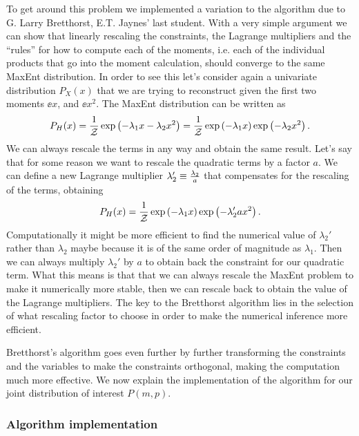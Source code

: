 To get around this problem we implemented a variation to the algorithm due to
G. Larry Bretthorst, E.T. Jaynes' last student. With a very simple argument we
can show that linearly rescaling the constraints, the Lagrange multipliers and
the ``rules'' for how to compute each of the moments, i.e. each of the
individual products that go into the moment calculation, should converge to the
same MaxEnt distribution. In order to see this let's consider again a
univariate distribution $P_X(x)$ that we are trying to reconstruct given the
first two moments $\ee{x}$, and $\ee{x^2}$. The MaxEnt distribution can be
written as
\begin{equation}
  P_H(x) = {1 \over \mathcal{Z}}
  \exp \left(- \lambda_1 x - \lambda_2 x^2 \right) =
  {1 \over \mathcal{Z}}
  \exp \left(- \lambda_1 x \right) \exp \left( - \lambda_2 x^2 \right).
\end{equation}
We can always rescale the terms in any way and obtain the same result. Let's
say that for some reason we want to rescale the quadratic terms by a factor
$a$. We can define a new Lagrange multiplier $\lambda_2' \equiv {\lambda_2
\over a}$ that compensates for the rescaling of the terms, obtaining
\begin{equation}
  P_H(x) = {1 \over \mathcal{Z}}
  \exp \left(- \lambda_1 x \right) \exp \left( - \lambda_2' ax^2 \right).
\end{equation}
Computationally it might be more efficient to find the numerical value of
$\lambda_2'$ rather than $\lambda_2$ maybe because it is of the same order of
magnitude as $\lambda_1$. Then we can always multiply $\lambda_2'$ by $a$ to
obtain back the constraint for our quadratic term. What this means is that that
we can always rescale the MaxEnt problem to make it numerically more stable,
then we can rescale back to obtain the value of the Lagrange multipliers. The
key to the Bretthorst algorithm lies in the selection of what rescaling factor
to choose in order to make the numerical inference more efficient.

Bretthorst's algorithm goes even further by further transforming the
constraints and the variables to make the constraints orthogonal, making the
computation much more effective. We now explain the implementation of the
algorithm for our joint distribution of interest $P(m, p)$.

\subsubsection{Algorithm implementation}

